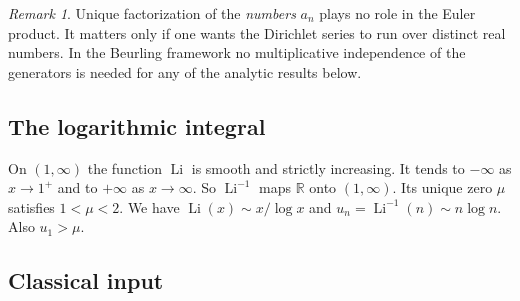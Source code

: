 \documentclass[12pt,letterpaper]{article}
\theoremstyle{definition}
\theoremstyle{remark}
\newtheorem{remark}[theorem]{Remark}
\numberwithin{equation}{section}
\newcommand{\Li}{\operatorname{Li}}
\newcommand{\RR}{\mathbb{R}}
\begin{document}
\begin{remark}\label{rem:UF}
Unique factorization of the \emph{numbers} $a_n$ plays no role in the
Euler product. It matters only if one wants the Dirichlet series to run
over distinct real numbers. In the Beurling framework no
multiplicative independence of the generators is needed for any of the
analytic results below.
\end{remark}

\subsection{The logarithmic integral}

On $(1,\infty)$ the function $\Li$ is smooth and strictly increasing. It
tends to $-\infty$ as $x\to1^+$ and to $+\infty$ as $x\to\infty$. So
$\Li^{-1}$ maps $\RR$ onto $(1,\infty)$. Its unique zero $\mu$ satisfies
$1<\mu<2$. We have $\Li(x)\sim x/\log x$ and $u_n=\Li^{-1}(n)\sim n\log n$.
Also $u_1>\mu$.

\subsection{Classical input}
\end{document}
